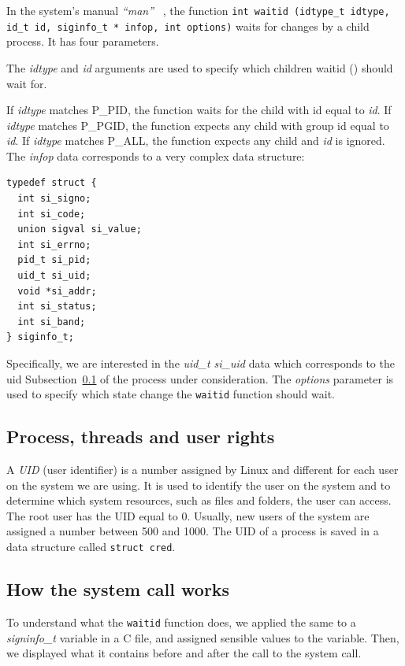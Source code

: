 \documentclass{masterthesis}
\newcommand{\refToSubSection}[1]{Subsection~\ref{subsect:#1}\xspace}
\begin{document}
In the system's manual \emph{``man''} ~\cite{torvalds2002Linux}, the function \texttt{int waitid (idtype_t idtype, id_t id, siginfo_t * infop, int options)} waits for changes by a child process. It has four parameters.

The \textit{idtype} and \textit {id} arguments are used to specify which children waitid () should wait for.

If \textit{idtype} matches P\_PID, the function waits for the child with id equal to \textit{id}.
If \textit{idtype} matches P\_PGID, the function expects any child with group id equal to \textit{id}.
If \textit{idtype} matches P\_ALL, the function expects any child and \textit{id} is ignored.
The \textit{infop} data corresponds to a very complex data structure:

\begin{lstlisting}
typedef struct {
  int si_signo;
  int si_code;
  union sigval si_value;
  int si_errno;
  pid_t si_pid;
  uid_t si_uid;
  void *si_addr;
  int si_status;
  int si_band;
} siginfo_t;
\end{lstlisting}
Specifically, we are interested in the \textit{uid\_t si\_uid} data which corresponds to the uid \refToSubSection{proc_trhreads} of the process under consideration.  
The \textit{options} parameter is used to specify which state change the \texttt{waitid} function should wait.

\subsection{Process, threads and user rights}
\label{subsect:proc_trhreads}
A \emph{UID} (user identifier) is a number assigned by Linux and different for each user on the system we are using.
It is used to identify the user on the system and to determine which system resources, such as files and folders, the user can access.
The root user has the UID equal to 0. Usually, new users of the system are assigned a number between 500 and 1000.
The UID of a process is saved in a data structure called \texttt{struct cred}.


\subsection{How the system call works}
\label{subsect:how_waitid}

To understand what the \texttt{waitid} function does, we applied the same to a \textit{signinfo\_t} variable in a C file, and assigned sensible values to the variable. Then, we displayed what it contains before and after the call to the system call.
\end{document}
